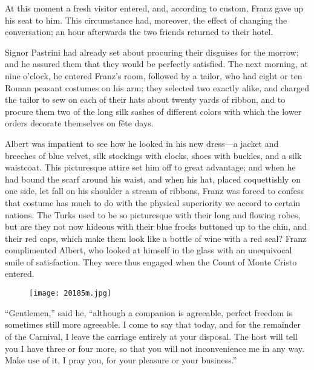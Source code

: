 At this moment a fresh visitor entered, and, according to custom, Franz
gave up his seat to him. This circumstance had, moreover, the effect of
changing the conversation; an hour afterwards the two friends returned
to their hotel.

Signor Pastrini had already set about procuring their disguises for the
morrow; and he assured them that they would be perfectly satisfied. The
next morning, at nine o’clock, he entered Franz’s room, followed by a
tailor, who had eight or ten Roman peasant costumes on his arm; they
selected two exactly alike, and charged the tailor to sew on each of
their hats about twenty yards of ribbon, and to procure them two of the
long silk sashes of different colors with which the lower orders
decorate themselves on fête days.

Albert was impatient to see how he looked in his new dress—a jacket and
breeches of blue velvet, silk stockings with clocks, shoes with
buckles, and a silk waistcoat. This picturesque attire set him off to
great advantage; and when he had bound the scarf around his waist, and
when his hat, placed coquettishly on one side, let fall on his shoulder
a stream of ribbons, Franz was forced to confess that costume has much
to do with the physical superiority we accord to certain nations. The
Turks used to be so picturesque with their long and flowing robes, but
are they not now hideous with their blue frocks buttoned up to the
chin, and their red caps, which make them look like a bottle of wine
with a red seal? Franz complimented Albert, who looked at himself in
the glass with an unequivocal smile of satisfaction. They were thus
engaged when the Count of Monte Cristo entered.

\begin{figure}[h]
\texttt{[image: 20185m.jpg]}
\end{figure}

“Gentlemen,” said he, “although a companion is agreeable, perfect
freedom is sometimes still more agreeable. I come to say that today,
and for the remainder of the Carnival, I leave the carriage entirely at
your disposal. The host will tell you I have three or four more, so
that you will not inconvenience me in any way. Make use of it, I pray
you, for your pleasure or your business.”

